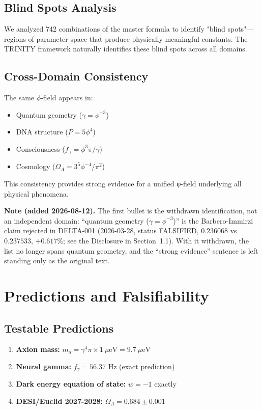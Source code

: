 \documentclass[12pt,a4paper]{article}
\begin{document}
\subsection{Blind Spots Analysis}

We analyzed 742 combinations of the master formula to identify "blind spots"—regions
of parameter space that produce physically meaningful constants. The TRINITY
framework naturally identifies these blind spots across all domains.

\subsection{Cross-Domain Consistency}

The same $\phi$-field appears in:
\begin{itemize}
    \item Quantum geometry ($\gamma = \phi^{-3}$)
    \item DNA structure ($P = 5\phi^4$)
    \item Consciousness ($f_\gamma = \phi^3\pi/\gamma$)
    \item Cosmology ($\Omega_\Lambda = 3^5\phi^{-4}/\pi^2$)
\end{itemize}

This consistency provides strong evidence for a unified φ-field underlying
all physical phenomena.

\textbf{Note (added 2026-08-12).} The first bullet is the withdrawn identification, not an
independent domain: ``quantum geometry ($\gamma = \phi^{-3}$)'' is the Barbero-Immirzi claim
rejected in DELTA-001 (2026-03-28, status FALSIFIED, $0.236068$ vs $0.237533$, $+0.617\%$;
see the Disclosure in Section~1.1). With it withdrawn, the list no longer spans quantum
geometry, and the ``strong evidence'' sentence is left standing only as the original text.

\section{Predictions and Falsifiability}

\subsection{Testable Predictions}

\begin{enumerate}
    \item \textbf{Axion mass:} $m_a = \gamma^4 \pi \times 1~\mu\text{eV} = 9.7~\mu\text{eV}$
    \item \textbf{Neural gamma:} $f_\gamma = 56.37$ Hz (exact prediction)
    \item \textbf{Dark energy equation of state:} $w = -1$ exactly
    \item \textbf{DESI/Euclid 2027-2028:} $\Omega_\Lambda = 0.684 \pm 0.001$
\end{enumerate}
\end{document}
